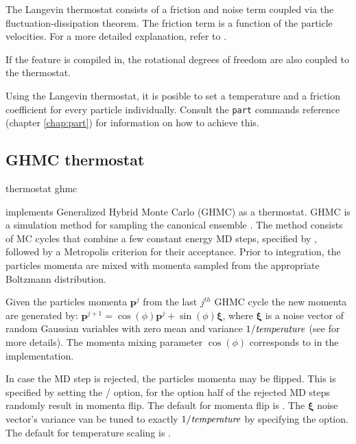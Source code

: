 The Langevin thermostat consists of a friction and noise term coupled
via the fluctuation-dissipation theorem. The friction term is a
function of the particle velocities. For a more detailed explanation,
refer to \cite{grest86a}.

If the feature  is compiled in, the rotational
degrees of freedom are also coupled to the thermostat.

Using the Langevin thermostat, it is posible to set a temperature and
a friction coefficient for every particle individually. Consult the
\texttt{part} commands reference (chapter \ref{chap:part}) for
information on how to achieve this.

\subsection{GHMC thermostat}

\begin{essyntax}
  thermostat ghmc     
\end{essyntax}

\es implements Generalized Hybrid Monte Carlo (GHMC) as a thermostat. GHMC is a
simulation method for sampling the canonical ensemble \cite{mehlig92}. The
method consists of MC cycles that combine a few constant energy MD steps,
specified by , followed by a Metropolis criterion for their
acceptance. Prior to integration, the particles momenta are mixed with momenta
sampled from the appropriate Boltzmann distribution. 

Given the particles momenta $\mathbf{p}^j$ from the last $j^{th}$
GHMC cycle the new momenta are generated
by: $\mathbf{p}^{j+1}=\cos(\phi)\mathbf{p}^j+\sin(\phi)\pmb{\xi}$, where
$\pmb{\xi}$ is a noise vector of random Gaussian variables with zero mean
and variance $1/\mathrm{\mathit{temperature}}$ (see 
\cite{horowitz91} for more details). The
momenta mixing parameter $\cos(\phi)$ corresponds to  in the
implementation.

In case the MD step is rejected, the particles momenta may be
flipped. This is specified by setting the  /
 option, for the  option half of the
rejected MD steps randomly result in momenta flip. The default for momenta
flip is . The $\pmb{\xi}$ noise vector's variance van be
tuned to exactly $1/\mathrm{\mathit{temperature}}$ by specifying the 
option. The default for temperature scaling is .


